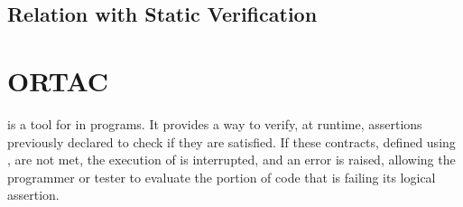 \subsection{Relation with Static Verification}
\label{sub:relation_with_static_verification}

\section{ORTAC}
\label{sec:ortac}

\ortac is a tool for \rac in \ocaml programs. It provides a way to verify, at runtime, 
assertions previously declared to check if they are satisfied. If these contracts, 
defined using \why, are not met, the execution of \ortac is interrupted, and an error 
is raised, allowing the programmer or tester to evaluate the portion of code that is 
failing its logical assertion.